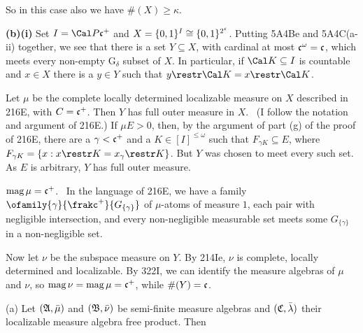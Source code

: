 {So in this case also we have $\#(X)\ge\kappa$.

\medskip

{\bf (b)(i)} Set $I=\Cal P\frak c^+$ and
$X=\{0,1\}^I\cong\{0,1\}^{2^{\frak c}}$.   Putting 5A4Be and 5A4C(a-ii)
together, we see that there is a set $Y\subseteq X$, with cardinal
at most $\frak c^{\omega}=\frak c$, which meets every non-empty
G$_{\delta}$ subset of $X$.   In particular, if $\Cal K\subseteq I$ is
countable and $x\in X$ there is a $y\in Y$ such that
$y\restr\Cal K=x\restr\Cal K$.

\medskip

 Let $\mu$ be the complete locally determined
localizable
measure on $X$ described in 216E, with $C=\frak c^+$.   Then $Y$ has
full outer measure in $X$.   \Prf\ (I follow the notation and argument
of 216E.)   If
$\mu E>0$, then, by the argument of part (g) of the proof of 216E,
there are a $\gamma<\frak c^+$ and a $K\in[I]^{\le\omega}$ such that
$F_{\gamma K}\subseteq E$, where
$F_{\gamma K}=\{x:x\restr K=x_{\gamma}\restr K\}$.   But $Y$ was
chosen to meet every such set.   As $E$ is arbitrary, $Y$ has full outer
measure.\ \Qed

\medskip

 $\mathop{\text{mag}}\mu=\frak c^+$.   \Prf\ In the language of
216E, we have a family $\ofamily{\gamma}{\frakc^+}{G_{\{\gamma\}}}$ of
$\mu$-atoms of measure $1$, each pair with negligible intersection,
and every non-negligible measurable set meets some $G_{\{\gamma\}}$ in a
non-negligible set.\ \Qed

\medskip

 Now let $\nu$ be the subspace measure on $Y$.   By
214Ie, $\nu$ is complete, locally determined and localizable.   By
322I, we can identify the measure algebras of $\mu$ and $\nu$, so
$\mathop{\text{mag}}\nu=\mathop{\text{mag}}\mu=\frak c^+$, while $\#(Y)=\frak c$.
}%


 (a) Let $(\frak A,\bar\mu)$ and
$(\frak B,\bar\nu)$ be semi-finite measure algebras and
$(\frak C,\bar\lambda)$ their localizable measure algebra free product.
Then



